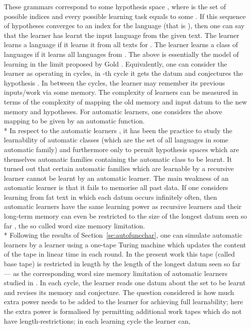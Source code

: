\documentclass{LMCS}
\theoremstyle{plain}\newtheorem{athm}[thm]{Theorem}
\theoremstyle{plain}\newtheorem{aprop}[thm]{Proposition}
\theoremstyle{plain}\newtheorem{aprob}[thm]{Open Problem}
\theoremstyle{plain}\newtheorem{acor}[thm]{Corollary}
\theoremstyle{plain}\newtheorem{alem}[thm]{Lemma}
\theoremstyle{definition}\newtheorem{adefn}[thm]{Definition}
\theoremstyle{definition}\newtheorem{arem}[thm]{Remark}
\theoremstyle{plain}\newtheorem{aexmp}[thm]{Example}
\theoremstyle{plain}\newtheorem{aclm}[thm]{Claim}
\def\sp{\\*\indent}
\begin{document}
These grammars correspond to some hypothesis space ,
where  is the set of possible indices and every possible learning
task equals to some .
If this sequence of hypotheses converges to an index  for the language 
(that is ),
then one can say that the learner has learnt the input language from
the given text. The learner learns a language  if it learns it from all
texts for . The learner learns a class  of languages if it learns
all languages from .
The above is essentially the model of learning in the limit proposed
by Gold \cite{Go67}. Equivalently, one can consider the learner as
operating in cycles, in -th cycle it gets the datum  and
conjectures the hypothesis . In between the cycles, the learner
may remember its previous inputs/work via some memory. The
complexity of learners can be measured in terms of the complexity of
mapping the old memory and input datum to the new memory and hypotheses.
For automatic learners, one considers the above mapping to be given by
an automatic function.
\sp
In respect to the automatic learners
\cite{CJLOSS11,JLS09,JOPS10}, it has been the practice to study the
learnability of automatic classes (which are the set of all languages
in some automatic family) and furthermore only to permit hypothesis
spaces which are themselves automatic families containing the automatic
class to be learnt. It turned
out that certain automatic families which are learnable by a recursive
learner cannot be learnt by an automatic learner. The main weakness
of an automatic learner is that it fails to memorise all past data.
If one considers learning from fat text in which each datum occurs
infinitely often, then automatic learners have the same learning
power as recursive learners and their long-term memory can even
be restricted to the size of the longest datum seen so far \cite{JLS09},
the so called word size memory limitation.
\sp
Following the results of Section~\ref{se:autofuncchar},
one can simulate automatic learners by a learner using a one-tape Turing
machine which updates the content of the tape in linear time in
each round. In the present work this tape (called base tape)
is restricted in length by the length
of the longest datum seen so far --- as the corresponding word size
memory limitation of automatic learners studied in \cite{JLS09}. 
In each cycle, the
learner reads one datum about the set to be learnt and revises its
memory and conjecture. The question considered is how much extra power 
needs to be added to the learner for achieving full learnability; here
the extra power is formalised by permitting additional work tapes
which do not have length-restrictions; in each learning cycle the learner can,
\end{document}
